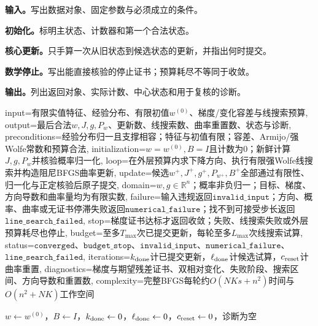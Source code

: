 \begin{keypointbox}[title={条件最大熵模型的BFGS学习：五步阅读}]
\textbf{输入。}写出数据对象、固定参数与必须成立的条件。\par
\textbf{初始化。}标明主状态、计数器和第一个合法状态。\par
\textbf{核心更新。}只手算一次从旧状态到候选状态的更新，并指出何时提交。\par
\textbf{数学停止。}写出能直接核验的停止证书；预算耗尽不等同于收敛。\par
\textbf{输出。}列出返回对象、实际计数、中心状态和用于复核的诊断。
\end{keypointbox}

\begin{AlgorithmContract}{
  input={有限实值特征、经验分布、有限初值$w^{(0)}$、梯度/变化容差与线搜索预算},
  output={最后合法$w,J,g,P_w$、更新数、线搜索数、曲率重置数、状态与诊断},
  preconditions={经验分布归一且支撑相容；特征与初值有限；容差、Armijo/强Wolfe常数和预算合法},
  initialization={$w=w^{(0)},B=I$且计数为$0$；新鲜计算$J,g,P_w$并核验概率归一化},
  loop={在外层预算内求下降方向、执行有限强Wolfe线搜索并构造阻尼BFGS曲率更新},
  update={候选$w^+,J^+,g^+,P_{w^+},B^+$全部通过有限性、归一化与正定核验后原子提交},
  domain={$w,g\in\mathbb R^n$；概率非负归一；目标、梯度、方向导数和曲率量均为有限实数},
  failure={输入违规返回$\mathtt{invalid\_input}$；方向、概率、曲率或无证书停滞失败返回$\mathtt{numerical\_failure}$；找不到可接受步长返回$\mathtt{line\_search\_failed}$},
  stop={梯度证书达标才返回收敛；失败、线搜索失败或外层预算耗尽也停止},
  budget={至多$T_{\max}$次已提交更新，每轮至多$L_{\max}$次线搜索试算},
  status={$\mathtt{converged}$、$\mathtt{budget\_stop}$、$\mathtt{invalid\_input}$、$\mathtt{numerical\_failure}$、$\mathtt{line\_search\_failed}$},
  iterations={$k_{\rm done}$计已提交更新，$\ell_{\rm done}$计候选试算，$c_{\rm reset}$计曲率重置},
  diagnostics={梯度与期望残差证书、双相对变化、失败阶段、搜索区间、方向导数和重置数},
  complexity={完整BFGS每轮约$O(NKs+n^2)$时间与$O(n^2+NK)$工作空间}
}
\begin{algorithm}[H]
\caption{条件最大熵模型的BFGS学习}\label{alg:V3-C01-bfgs}
$w\leftarrow w^{(0)}$，$B\leftarrow I$，$k_{\rm done}\leftarrow0$，$\ell_{\rm done}\leftarrow0$，$c_{\rm reset}\leftarrow0$，诊断为空\;

\end{algorithm}
\end{AlgorithmContract}
